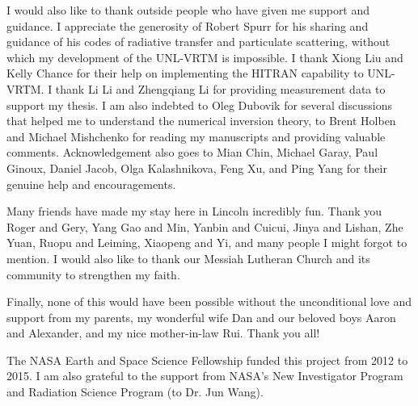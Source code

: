 \begin{acknowledgments}
I would also like to thank outside people who have given me support and 
guidance. I appreciate the generosity of Robert Spurr for his sharing
and guidance of his codes of radiative transfer and particulate
scattering, without which my development of the UNL-VRTM is impossible.
I thank Xiong Liu and Kelly Chance for their help on implementing the HITRAN
capability to UNL-VRTM. I thank Li Li and Zhengqiang Li for providing
measurement data to support my thesis. I am also indebted to Oleg
Dubovik for several discussions that helped me to understand the
numerical inversion theory, to Brent Holben and Michael Mishchenko for
reading my manuscripts and providing valuable comments. Acknowledgement
also goes to Mian Chin, Michael Garay, Paul Ginoux, Daniel Jacob, 
Olga Kalashnikova, Feng Xu, and Ping Yang for their genuine help and 
encouragements. 

Many friends have made my stay here in Lincoln incredibly fun. Thank you
Roger and Gery, Yang Gao and Min, Yanbin and Cuicui, Jinya and Lishan, 
Zhe Yuan, Ruopu and Leiming, Xiaopeng and Yi, and many people I might
forgot to mention. I would also like to thank our Messiah Lutheran Church and
its community to strengthen my faith. 

Finally, none of this would have been possible without the unconditional
love and support from my parents, my wonderful wife Dan and our beloved boys 
Aaron and Alexander, and my nice mother-in-law Rui. Thank you all!  

\end{acknowledgments}

\begin{grantinfo}
  The NASA Earth and Space Science Fellowship funded this project from
  2012 to 2015. I am also grateful to the support
  from NASA's New Investigator Program and Radiation Science Program
  (to Dr. Jun Wang).
\end{grantinfo}
